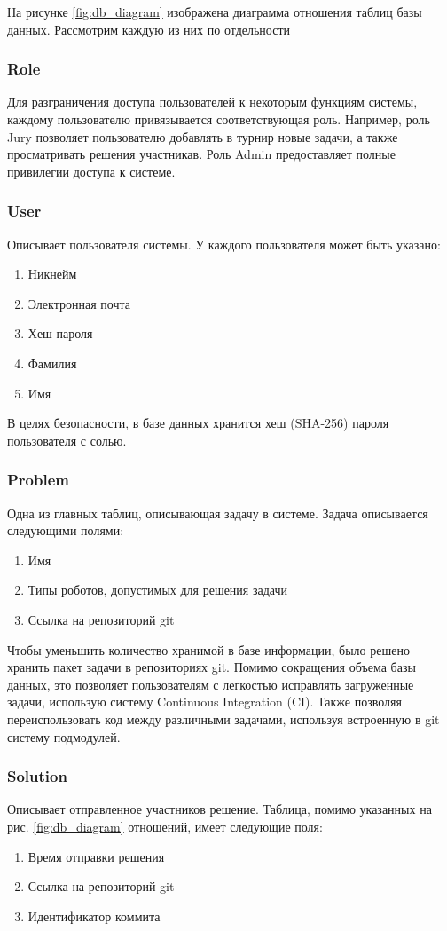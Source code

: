 \documentclass[a4paper,12pt]{article}
\begin{document}
На рисунке \ref{fig:db_diagram} изображена диаграмма отношения таблиц базы данных. 
Рассмотрим каждую из них по отдельности

\subsubsection{Role}
Для разграничения доступа пользователей к некоторым функциям системы, каждому пользователю привязывается соответствующая роль. Например, роль Jury позволяет пользователю добавлять в турнир новые задачи, а также просматривать решения участникав. Роль Admin предоставляет полные привилегии доступа к системе. 

\subsubsection{User}
Описывает пользователя системы.
У каждого пользователя может быть указано:
\begin{enumerate}
    \item Никнейм
    \item Электронная почта
    \item Хеш пароля
    \item Фамилия
    \item Имя
\end{enumerate}
В целях безопасности, в базе данных хранится хеш (SHA-256) пароля пользователя с солью. 

\subsubsection{Problem}
Одна из главных таблиц, описывающая задачу в системе.
Задача описывается следующими полями:
\begin{enumerate}
    \item Имя
    \item Типы роботов, допустимых для решения задачи
    \item Ссылка на репозиторий git
\end{enumerate}
Чтобы уменьшить количество хранимой в базе информации, было решено хранить пакет задачи в репозиториях git. Помимо сокращения объема базы данных, это позволяет пользователям с легкостью исправлять загруженные задачи, использую систему Continuous Integration (CI). Также позволяя переиспользовать код между различными задачами, используя встроенную в git систему подмодулей.

\subsubsection{Solution}
Описывает отправленное участников решение. Таблица, помимо указанных на рис. \ref{fig:db_diagram} отношений, имеет следующие поля:
\begin{enumerate}
    \item Время отправки решения
    \item Ссылка на репозиторий git
    \item Идентификатор коммита
\end{enumerate}
\end{document}
